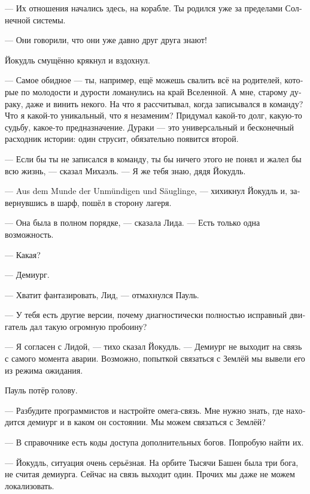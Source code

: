\documentclass[a4paper,10pt,fleqn]{book}\usepackage{polyglossia}\setdefaultlanguage[babelshorthands=true]{russian}\setotherlanguage{english}\defaultfontfeatures{Ligatures=TeX,Mapping=tex-text}\usepackage{xcolor}\newcommand{\ml}[3]{#2}
\newcommand{\asterism}{\vspace{1em}{\centering\Large\bfseries$\ast~\ast~\ast$\par}\vspace{1em}}
\begin{document}
--- Их отношения начались здесь, на корабле.
Ты родился уже за пределами Солнечной системы.

--- Они говорили, что они уже давно друг друга знают!

Йокудль смущённо крякнул и вздохнул.

--- Самое обидное --- ты, например, ещё можешь свалить всё на родителей, которые по молодости и дурости ломанулись на край Вселенной.
А мне, старому дураку, даже и винить некого.
На что я рассчитывал, когда записывался в команду?
Что я какой-то уникальный, что я незаменим?
Придумал какой-то долг, какую-то судьбу, какое-то предназначение.
Дураки --- это универсальный и бесконечный расходник истории: один струсит, обязательно появится второй.

--- Если бы ты не записался в команду, ты бы ничего этого не понял и жалел бы всю жизнь, --- сказал Михаэль.
--- Я же тебя знаю, дядя Йокудль.

--- Aus dem Munde der Unmündigen und Säuglinge, --- хихикнул Йокудль и, завернувшись в шарф, пошёл в сторону лагеря.

\asterism

--- Она была в полном порядке, --- сказала Лида.
--- Есть только одна возможность.

--- Какая?

--- Демиург.

--- Хватит фантазировать, Лид, --- отмахнулся Пауль.

--- У тебя есть другие версии, почему диагностически полностью исправный двигатель дал такую огромную пробоину?

--- Я согласен с Лидой, --- тихо сказал Йокудль.
--- Демиург не выходит на связь с самого момента аварии.
Возможно, попыткой связаться с Землёй мы вывели его из режима ожидания.

Пауль потёр голову.

--- Разбудите программистов и настройте омега-связь.
Мне нужно знать, где находится демиург и в каком он состоянии.
Мы можем связаться с Землёй?

--- В справочнике есть коды доступа дополнительных богов.
Попробую найти их.

\asterism

--- Йокудль, ситуация очень серьёзная.
На орбите Тысячи Башен была три бога, не считая демиурга.
\ml{$0$}
{Сейчас на связь выходит один.}
{Now we can contact only one of them.}
\ml{$0$}
{Прочих мы даже не можем локализовать.}
{The others we can't even locate.''}
\end{document}
